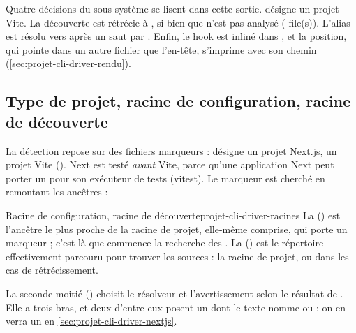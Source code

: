 Quatre décisions du sous-système se lisent dans cette sortie.  désigne un projet Vite. La découverte est rétrécie à , si bien que  n'est pas analysé ( file(s)\fg{}). L'alias  est résolu vers  après un saut par . Enfin, le hook est inliné dans , et la position, qui pointe dans un autre fichier que l'en-tête, s'imprime avec son chemin (\cref{sec:projet-cli-driver-rendu}).

\subsection{Type de projet, racine de configuration, racine de découverte}


La détection repose sur des fichiers marqueurs :  désigne un projet Next.js,  un projet Vite (). Next est testé \emph{avant} Vite, parce qu'une application Next peut porter un  pour son exécuteur de tests (vitest). Le marqueur est cherché en remontant les ancêtres :


\begin{definition}{Racine de configuration, racine de découverte}{projet-cli-driver-racines}
La  () est l'ancêtre le plus proche de la racine de projet, elle-même comprise, qui porte un marqueur ; c'est là que commence la recherche des . La  () est le répertoire effectivement parcouru pour trouver les sources : la racine de projet, ou  dans les cas de rétrécissement.
\end{definition}


La seconde moitié () choisit le résolveur et l'avertissement selon le résultat de . Elle a trois bras, et deux d'entre eux posent un  dont le texte nomme  ou  ; on en verra un en \cref{sec:projet-cli-driver-nextjs}.

